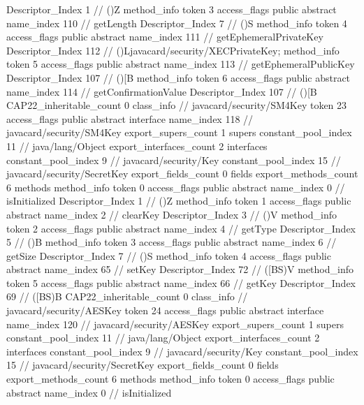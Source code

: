 {{{{{					Descriptor_Index	1		// ()Z
				}
				method_info {
					token	3
					access_flags	public abstract
					name_index	110		// getLength
					Descriptor_Index	7		// ()S
				}
				method_info {
					token	4
					access_flags	public abstract
					name_index	111		// getEphemeralPrivateKey
					Descriptor_Index	112		// ()Ljavacard/security/XECPrivateKey;
				}
				method_info {
					token	5
					access_flags	public abstract
					name_index	113		// getEphemeralPublicKey
					Descriptor_Index	107		// ()[B
				}
				method_info {
					token	6
					access_flags	public abstract
					name_index	114		// getConfirmationValue
					Descriptor_Index	107		// ()[B
				}
			}
			CAP22_inheritable_count	0
		}
		class_info {		// javacard/security/SM4Key
			token	23
			access_flags	public abstract interface
			name_index	118		// javacard/security/SM4Key
			export_supers_count	1
			supers {
				constant_pool_index	11		// java/lang/Object
			}
			export_interfaces_count	2
			interfaces {
				constant_pool_index	9		// javacard/security/Key
				constant_pool_index	15		// javacard/security/SecretKey
			}
			export_fields_count	0
			fields {
			}
			export_methods_count	6
			methods {
				method_info {
					token	0
					access_flags	public abstract
					name_index	0		// isInitialized
					Descriptor_Index	1		// ()Z
				}
				method_info {
					token	1
					access_flags	public abstract
					name_index	2		// clearKey
					Descriptor_Index	3		// ()V
				}
				method_info {
					token	2
					access_flags	public abstract
					name_index	4		// getType
					Descriptor_Index	5		// ()B
				}
				method_info {
					token	3
					access_flags	public abstract
					name_index	6		// getSize
					Descriptor_Index	7		// ()S
				}
				method_info {
					token	4
					access_flags	public abstract
					name_index	65		// setKey
					Descriptor_Index	72		// ([BS)V
				}
				method_info {
					token	5
					access_flags	public abstract
					name_index	66		// getKey
					Descriptor_Index	69		// ([BS)B
				}
			}
			CAP22_inheritable_count	0
		}
		class_info {		// javacard/security/AESKey
			token	24
			access_flags	public abstract interface
			name_index	120		// javacard/security/AESKey
			export_supers_count	1
			supers {
				constant_pool_index	11		// java/lang/Object
			}
			export_interfaces_count	2
			interfaces {
				constant_pool_index	9		// javacard/security/Key
				constant_pool_index	15		// javacard/security/SecretKey
			}
			export_fields_count	0
			fields {
			}
			export_methods_count	6
			methods {
				method_info {
					token	0
					access_flags	public abstract
					name_index	0		// isInitialized
}}}}}

